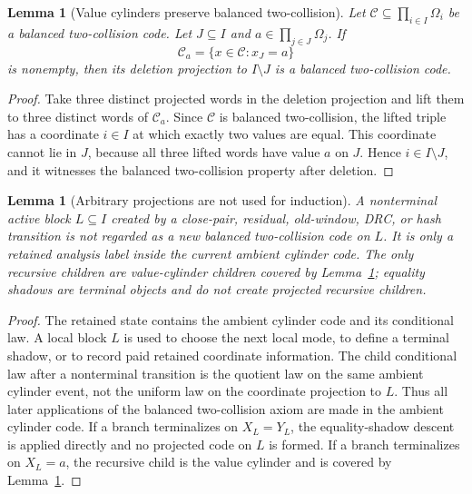 \documentclass[11pt]{article}
\newtheorem{lemma}[theorem]{Lemma}
\theoremstyle{remark}
\newcommand{\C}{\mathcal C}
\begin{document}
\begin{lemma}[Value cylinders preserve balanced two-collision]\label{lem:app-cylinder-heredity}
Let $\C\subseteq\prod_{i\in I}\Omega_i$ be a balanced two-collision code.  Let $J\subseteq I$ and $a\in\prod_{j\in J}\Omega_j$.  If
\[
        \C_a=\{x\in\C:x_J=a\}
\]
is nonempty, then its deletion projection to $I\setminus J$ is a balanced two-collision code.
\end{lemma}

\begin{proof}
Take three distinct projected words in the deletion projection and lift them to three distinct words of $\C_a$.  Since $\C$ is balanced two-collision, the lifted triple has a coordinate $i\in I$ at which exactly two values are equal.  This coordinate cannot lie in $J$, because all three lifted words have value $a$ on $J$.  Hence $i\in I\setminus J$, and it witnesses the balanced two-collision property after deletion.
\end{proof}

\begin{lemma}[Arbitrary projections are not used for induction]\label{lem:app-no-projection-induction}
A nonterminal active block $L\subseteq I$ created by a close-pair, residual, old-window, DRC, or hash transition is not regarded as a new balanced two-collision code on $L$.  It is only a retained analysis label inside the current ambient cylinder code.  The only recursive children are value-cylinder children covered by Lemma~\ref{lem:app-cylinder-heredity}; equality shadows are terminal objects and do not create projected recursive children.
\end{lemma}

\begin{proof}
The retained state contains the ambient cylinder code and its conditional law.  A local block $L$ is used to choose the next local mode, to define a terminal shadow, or to record paid retained coordinate information.  The child conditional law after a nonterminal transition is the quotient law on the same ambient cylinder event, not the uniform law on the coordinate projection to $L$.  Thus all later applications of the balanced two-collision axiom are made in the ambient cylinder code.  If a branch terminalizes on $X_L=Y_L$, the equality-shadow descent is applied directly and no projected code on $L$ is formed.  If a branch terminalizes on $X_L=a$, the recursive child is the value cylinder and is covered by Lemma~\ref{lem:app-cylinder-heredity}.
\end{proof}
\end{document}
